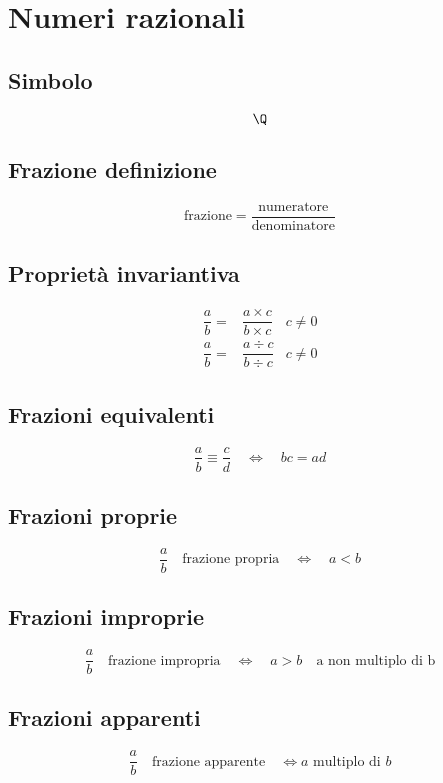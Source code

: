 \chapter{Numeri razionali}
\section{Simbolo}
\begin{equation}
\Q
\end{equation}
\section{Frazione definizione}
\begin{equation}
\text{frazione}=\dfrac{\text{numeratore}}{\text{denominatore}}
\end{equation}
\section{Proprietà invariantiva}
\begin{align}
\dfrac{a}{b}=&\dfrac{a\times c}{b\times c}&c\neq 0\\
\dfrac{a}{b}=&\dfrac{a\div c}{b\div c}&c\neq 0
\end{align}
\section{Frazioni equivalenti}
\begin{equation}
\dfrac{a}{b}\equiv\dfrac{c}{d}\quad\Longleftrightarrow\quad bc=ad
\end{equation}
\section{Frazioni proprie}
\begin{equation}
\dfrac{a}{b}\quad\text{frazione propria}\quad\Longleftrightarrow\quad a<b
\end{equation}
\section{Frazioni improprie}
\begin{equation}
\dfrac{a}{b}\quad\text{frazione impropria}\quad\Longleftrightarrow\quad a>b\quad\text{a non multiplo di b}
\end{equation}
\section{Frazioni apparenti}
\begin{equation}
\dfrac{a}{b}\quad\text{frazione apparente}\quad\Longleftrightarrow\text{$a$ multiplo di $b$}
\end{equation}
